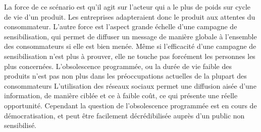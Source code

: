 \medbreak
La force de ce scénario est qu’il agit sur l’acteur qui a le plus de poids sur cycle de vie d’un produit. Les entreprises adapteraient donc le produit aux attentes du consommateur. L’autre force est l’aspect grande échelle d’une campagne de sensibilisation, qui permet de diffuser un message de manière globale à l’ensemble des consommateurs si elle est bien menée.
\medbreak
Même si l’efficacité d’une campagne de sensibilisation n’est plus à prouver, elle ne touche pas forcément les personnes les plus concernées. L'obsolescence programmée, ou la durée de vie faible des produits n’est pas non plus dans les préoccupations actuelles de la plupart des consommateurs
\medbreak
L’utilisation des réseaux sociaux permet une diffusion aisée d’une information, de manière ciblée et ce à faible coût, ce qui présente une réelle opportunité.
\medbreak
Cependant la question de l’obsolescence programmée est en cours de démocratisation, et peut être facilement décrédibilisée auprès d'un public non sensibilisé.

